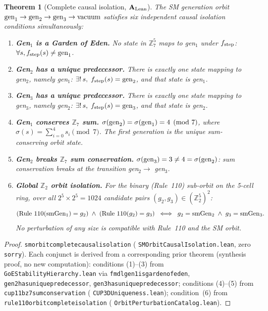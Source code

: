 \documentclass[11pt]{article}
\newtheorem{theorem}{Theorem}[section]
\theoremstyle{remark}
\newcommand{\lean}[1]{%
  \penalty-100
  \begingroup\def\_{\textunderscore\allowbreak}\texttt{#1}\endgroup}
\newcommand{\CatAL}{\ensuremath{\textbf{A}_{\rm Lean}}}
\begin{document}
\begin{theorem}[Complete causal isolation, $\CatAL$]\label{thm:isolation_master}
The SM generation orbit ${\rm gen}_1 \to {\rm gen}_2 \to {\rm gen}_3 \to {\rm vacuum}$
satisfies six independent causal isolation conditions simultaneously:
\begin{enumerate}[label=\textup{(\arabic*)}]
\item \textbf{Gen$_1$ is a Garden of Eden.}
      No state in $\mathbb{Z}_7^5$ maps to gen$_1$ under $f_{\rm step}$:
      $\forall s, f_{\rm step}(s) \neq {\rm gen}_1$.

\item \textbf{Gen$_2$ has a unique predecessor.}
      There is exactly one state mapping to gen$_2$, namely gen$_1$:
      $\exists!\, s,\; f_{\rm step}(s) = {\rm gen}_2$, and that state is gen$_1$.

\item \textbf{Gen$_3$ has a unique predecessor.}
      There is exactly one state mapping to gen$_3$, namely gen$_2$:
      $\exists!\, s,\; f_{\rm step}(s) = {\rm gen}_3$, and that state is gen$_2$.

\item \textbf{Gen$_1$ conserves $\mathbb{Z}_7$ sum.}
      $\sigma({\rm gen}_2) = \sigma({\rm gen}_1) = 4 \pmod{7}$,
      where $\sigma(s) = \sum_{i=0}^{4} s_i \pmod{7}$.
      The first generation is the unique sum-conserving orbit state.

\item \textbf{Gen$_2$ breaks $\mathbb{Z}_7$ sum conservation.}
      $\sigma({\rm gen}_3) = 3 \neq 4 = \sigma({\rm gen}_2)$:
      sum conservation breaks at the transition gen$_2 \to$ gen$_3$.

\item \textbf{Global $\mathbb{Z}_2$ orbit isolation.}
      For the binary (Rule~110) sub-orbit on the 5-cell ring, over all $2^5 \times 2^5 = 1024$
      candidate pairs $(g_2, g_3) \in (\mathbb{Z}_2^5)^2$:
      \[
        (\text{Rule~110}({\rm smGen}_1) = g_2)\;\wedge\;(\text{Rule~110}(g_2) = g_3)
        \;\iff\;
        g_2 = {\rm smGen}_2 \;\wedge\; g_3 = {\rm smGen}_3.
      \]
      No perturbation of any size is compatible with Rule~110 and the SM orbit.
\end{enumerate}
\end{theorem}

\begin{proof}
\lean{sm\_orbit\_complete\_causal\_isolation}
(\lean{SMOrbitCausalIsolation.lean}, zero \texttt{sorry}).
Each conjunct is derived from a corresponding prior theorem (synthesis proof, no new computation):
conditions (1)--(3) from \lean{GoEStabilityHierarchy.lean} via
\lean{fmdl\_gen1\_is\_garden\_of\_eden},
\lean{gen2\_has\_unique\_predecessor},
\lean{gen3\_has\_unique\_predecessor};
conditions (4)--(5) from \lean{cup11b\_z7\_sum\_conservation}
(\lean{CUP3DUniqueness.lean});
condition~(6) from \lean{rule110\_orbit\_complete\_isolation}
(\lean{OrbitPerturbationCatalog.lean}).
\end{proof}
\end{document}
